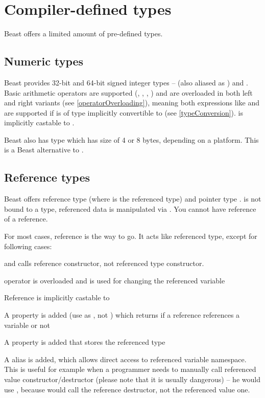 \section{Compiler-defined types}
Beast offers a limited amount of pre-defined types.

\subsection{Numeric types}
Beast provides 32-bit and 64-bit signed integer types --  (also aliased as ) and . Basic arithmetic operators are supported (\inlineCode{+}, \inlineCode{-}, \inlineCode{*}, \inlineCode{/}) and are overloaded in both left and right variants (see \autoref{operatorOverloading}), meaning both expressions like  and  are supported if  is of type implicitly convertible to  (see \autoref{typeConversion}).  is implicitly castable to .

Beast also has type  which has size of 4 or 8 bytes, depending on a platform. This is a Beast alternative to .

\subsection{Reference types}
Beast offers reference type  (where  is the referenced type) and pointer type .  is not bound to a type, referenced data is manipulated via .  You cannot have reference of a reference.

For most cases, reference is the way to go. It acts like referenced type, except for following cases:
\begin{compactitem}
	\item {} and  calls reference constructor, not referenced type constructor.
	\item {} operator is overloaded and is used for changing the referenced variable
	\item Reference is implicitly castable to 
	\item A  property is added (use as , not ) which returns if a reference references a variable or not
	\item A  property is added that stores the referenced type
	\item A  alias is added, which allows direct access to referenced variable namespace. This is useful for example when a programmer needs to manually call referenced value constructor/destructor (please note that it is usually dangerous) -- he would use \-, because  would call the reference destructor, not the referenced value one.
\end{compactitem}
\pagebreak

